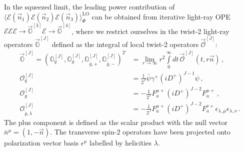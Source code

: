 \documentclass[letterpaper,11pt]{article}
\def\to{\rightarrow}
\begin{document}
In the squeezed limit, the leading power contribution of $\langle \mathcal{E}(\vec{n}_1)\mathcal{E}(\vec{n}_2)\mathcal{E}(\vec{n}_3)\rangle_\Phi^{\mathrm{LO}}$ can be obtained from iterative light-ray OPE $\mathcal{E}\mathcal{E} \mathcal{E} \to \vec{\mathbb{O}}^{[3]}\mathcal{E} \to \vec{\mathbb{O}}^{[4]}$, where we restrict ourselves in the twist-2 light-ray operators $\vec{\mathbb{O}}^{[J]}$ defined as the integral of local twist-2 operators $\vec{\mathcal{O}}^{[J]}$:
\begin{align}
\vec{\mathbb{O}}^{[J]}=\left( \mathbb{O}_q^{[J]}, \mathbb{O}_g^{[J]}, \mathbb{O}_{\tilde g,+}^{[J]}, \mathbb{O}_{\tilde g,-}^{[J]}  \right)^T &=\lim_{r\to \infty} r^2 \int\limits_0^{\infty} dt\, \vec{\mathcal{O}}^{[J]}(t,r\vec{n})\,,\\
\mathcal{O}_q^{[J]}&=\frac{1}{2^J}\bar \psi \gamma^+ ( iD^+)^{J-1}\psi\,,  \\
\mathcal{O}_g^{[J]}&=-\frac{1}{2^J} F_a^{\mu +}(i D^+)^{J-2}F_a^{\mu +}\,,  \\
\mathcal{O}_{\tilde g,\lambda}^{[J]}&=-\frac{1}{2^J} F_a^{\mu +}(i D^+)^{J-2}F_a^{\nu +}\epsilon_{\lambda, \mu}\epsilon_{\lambda, \nu}\,.
\end{align}
The plus component is defined as the scalar product with the null vector $\bar{n}^\mu=(1, -\vec{n})$. The transverse spin-$2$ operators have been projected onto polarization vector basis $\epsilon^\mu$ labelled by helicities $\lambda$.
\end{document}

